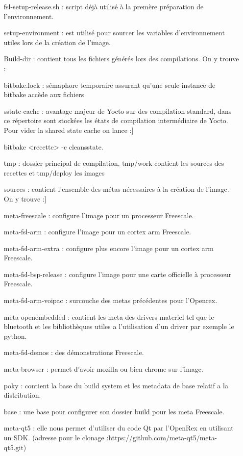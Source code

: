 \begin{itemize}
	\item[fsl-setup-release.sh :] script déjà utilisé à la premère préparation
	de l’environnement.
	\item[setup-environment :] est utilisé pour sourcer les variables d'environnement
	utiles lors de la création de l'image.
	\item[Build-dir :] contient tous les fichiers générés lors des compilations.
	On y trouve :
	\item[bitbake.lock :] sémaphore temporaire assurant qu’une seule instance de bitbake
	accède aux fichiers
	\item[sstate-cache :] avantage majeur de Yocto sur des compilation standard, dans ce répertoire sont stockées les états de compilation intermédiaire de Yocto. Pour vider la shared state cache on lance :]
	\begin{tcolorbox}
		bitbake <recette> -c cleansstate.
	\end{tcolorbox}

	\item[tmp :] dossier principal de compilation, tmp/work contient les sources des recettes et tmp/deploy les images
	\item[sources :] contient l'ensemble des     métas nécessaires à la création de l'image. On y trouve :]
	\item[meta-freescale :] configure l’image pour un processeur Freescale.
	\item[meta-fsl-arm :] configure l'image pour un cortex arm Freescale.
	\item[meta-fsl-arm-extra :] configure plus encore l'image pour un cortex arm Freescale.
	\item[meta-fsl-bsp-release :] configure l’image pour une carte officielle à processeur Freescale.
	\item[meta-fsl-arm-voipac :] surcouche des metas précédentes pour l’Openrex.
	\item[meta-openembedded :] contient les meta des drivers materiel tel que le bluetooth et les bibliothèques utiles a l'utilisation d’un driver par exemple le python.
	\item[meta-fsl-demos :] des démonstrations Freescale.
	\item[meta-browser :] permet d’avoir mozilla ou bien chrome sur l’image.
	\item[poky :] contient la base du build system et les metadata de base relatif a la distribution.
	\item[base :] une base pour configurer son dossier build pour les meta Freescale.
	\item[meta-qt5 :] elle nous permet d'utiliser du code Qt par l’OpenRex en utilisant un SDK. (adresse pour le clonage :https://github.com/meta-qt5/meta-qt5.git)


\end{itemize}
